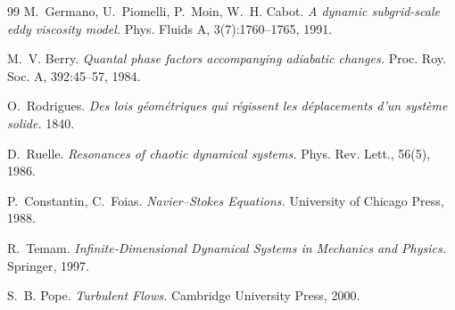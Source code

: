 \documentclass[11pt,a4paper,twoside]{article}
\theoremstyle{remark}
\begin{document}
\begin{thebibliography}{99}
 M.~Germano, U.~Piomelli, P.~Moin, W.~H. Cabot. \textit{A dynamic subgrid-scale eddy viscosity model.} Phys. Fluids A, 3(7):1760--1765, 1991.

 M.~V. Berry. \textit{Quantal phase factors accompanying adiabatic changes.} Proc. Roy. Soc. A, 392:45--57, 1984.

 O.~Rodrigues. \textit{Des lois géométriques qui régissent les déplacements d'un système solide.} 1840.

 D.~Ruelle. \textit{Resonances of chaotic dynamical systems.} Phys. Rev. Lett., 56(5), 1986.

 P.~Constantin, C.~Foias. \textit{Navier--Stokes Equations.} University of Chicago Press, 1988.

 R.~Temam. \textit{Infinite-Dimensional Dynamical Systems in Mechanics and Physics.} Springer, 1997.

 S.~B. Pope. \textit{Turbulent Flows.} Cambridge University Press, 2000.

\end{thebibliography}
\end{document}
